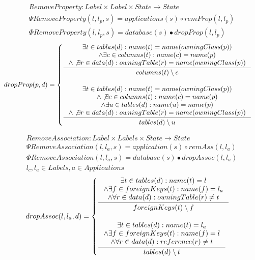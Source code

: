 \documentclass[11pt]{article}
\begin{document}
\begin{align*}
RemoveProperty: Label \times Label \times State \rightarrow State \\
\Psi RemoveProperty(l, l_p, s) =  applications(s) \circ  remProp(l, l_p) \\
\Phi RemoveProperty(l, l_p, s) =  database(s) \bullet dropProp(l, l_p) \end{align*}
\begin{align*}
dropProp(p, d) = \begin{cases}
 \inference{ \exists t \in tables(d) : name(t) = name(owningClass(p)) \\ \wedge \exists c \in columns(t) : name(c) = name(p) \\ \wedge \not \exists r \in data(d) : owningTable(r) = name(owningClass(p)) }{columns(t) \setminus c
} \\ \\
  \inference{ \exists t \in tables(d) : name(t) = name(owningClass(p)) \\ \wedge \not \exists c \in columns(t) : name(c) = name(p) \\ \wedge \exists u \in tables(d) : name(u) = name(p) \\ \wedge \not \exists r \in data(d) : owningTable(r) = name(owningClass(p))}{ tables(d) \setminus u }
 \end{cases}
\end{align*}

\begin{align*}
RemoveAssociation : Label \times Labels \times State \rightarrow State \\ 
\Psi RemoveAssociation(l, l_a, s) = application(s) \circ remAss(l, l_a) \\
\Phi RemoveAssociation(l, l_a, s) = database(s) \bullet dropAssoc(l, l_a) \\
l_c, l_a \in Labels, a \in Applications
\end{align*}
\begin{align*}
dropAssoc(l, l_a, d) =  \begin{cases}
 \inference{\exists t \in tables(d) : name(t) = l
 \\ \wedge \exists f \in foreignKeys(t) : name(f) = l_a
 \\ \wedge \forall r \in data(d) : owningTable(r) \neq t}{ foreignKeys(t) \setminus f }
 \\ \\
 \inference{\exists t \in tables(d) : name(t) = l_a
 \\ \wedge \exists f \in foreignKeys(t) : name(f) = l
 \\ \wedge \forall r \in data(d) : reference(r) \neq t}{ tables(d) \setminus t}
 \end{cases}
\end{align*}
\end{document}
